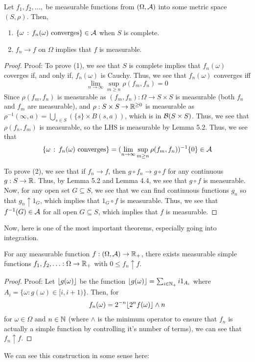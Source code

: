 \begin{lemma}
    Let $f_1, f_2, \ldots,$ be measurable functions from $(\Omega, \cal{A})$ into some metric space $(S, \rho)$. Then,
    \begin{enumerate}
        \item $\{\omega \col f_{n}(\omega) \text{ converges}\} \in \cal{A}$ when $S$ is complete.
        \item $f_n \to f$ on $\Omega$ implies that $f$ is measurable.
    \end{enumerate}
\end{lemma}
\begin{proof}{Proof:}
    To prove (1), we see that $S$ is complete implies that $f_{n}(\omega)$ coverges if, and only if, $f_{n}(\omega)$ is Cauchy. Thus, we see that $f_{n}(\omega)$ converges iff
    \[ \lim_{n \to \infty} \sup_{m \geq n} \rho(f_m, f_n) = 0 \]
    Since $\rho(f_m, f_n)$ is measurable as $(f_m, f_n) : \Omega \to S \times S$ is measurable (both $f_n$ and $f_m$ are measurable), and $\rho : S \times S \to \R^{\geq 0}$ is measurable as $\rho^{-1}(\infty, a) = \bigcup_{s \in S}(\{s\} \times B(s, a))$, which is in $\cal{B}(S \times S)$. Thus, we see that $\rho(f_n, f_m)$ is measurable, so the LHS is measurable by Lemma 5.2. Thus, we see that
    \[ \{\omega \col f_{n}(\omega) \text{ converges}\} = (\lim_{n \to \infty}\sup_{m \geq n} \rho(f_m, f_n))^{-1}\{0\} \in \cal{A} \]

    To prove (2), we see that if $f_n \to f$, then $g \circ f_n \to g \circ f$ for any continuous $g : S \to \R$. Thus, by Lemma 5.2 and Lemma 4.4, we see that $g \circ f$ is measurable. Now, for any open set $G \subseteq S$, we see that we can find continuous functions $g_n$ so that $g_n \uparrow 1_{G}$, which implies that $1_{G} \circ f$ is measurable. Thus, we see that $f^{-1}(G) \in \cal{A}$ for all open $G \subseteq S$, which implies that $f$ is measurable. 
\end{proof}

Now, here is one of the most important theorems, especially going into integration.

\begin{theorem}
    For any measurable function $f : (\Omega, \cal{A}) \to \R_{+}$, there exists measurable simple functions $f_1, f_2, \ldots : \Omega \to \R_{+}$ with $0 \leq f_n \uparrow f$. 
\end{theorem}
\begin{proof}{Proof:}
    Let $\floor{g(\omega)}$ be the function $\floor{g(\omega)} = \sum_{i \in \N_{+}} i1_{A_i}$ where $A_i = \{\omega : g(\omega) \in [i, i + 1)\}$. Then, for
    \[ f_{n}(\omega) = 2^{-n}\floor{2^{n}f(\omega)} \wedge n \]
    for $\omega \in \Omega$ and $n \in \N$ (where $\wedge$ is the minimum operator to ensure that $f_{n}$ is actually a simple function by controlling it's number of terms), we can see that $f_n \uparrow f$. 
\end{proof}
We can see this construction in some sense here:


